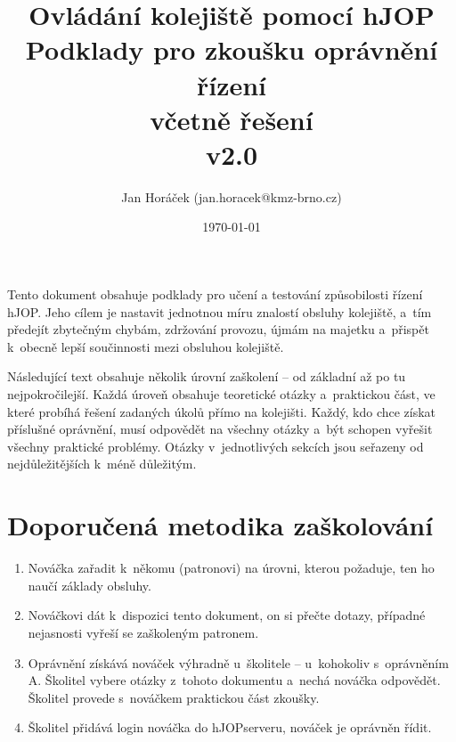 \documentclass[12pt,a4paper]{article}
\begin{document}
\thispagestyle{empty}

\setlength{\parindent}{0cm}
\setlength{\parskip}{.4\baselineskip plus2pt minus1pt}
\setlength{\droptitle}{-5em}

\title{\bfseries
{\Large Ovládání kolejiště pomocí hJOP\\}
{\LARGE Podklady pro zkoušku oprávnění řízení\\}
\ifsolution
{\Large \color{gray}včetně řešení\\}
\fi
{\small v2.0}}
\author{Jan Horáček (jan.horacek@kmz-brno.cz)}
\date{\today}
\maketitle

Tento dokument obsahuje podklady pro učení a testování způsobilosti řízení
hJOP. Jeho cílem je nastavit jednotnou míru znalostí obsluhy kolejiště, a~tím
předejít zbytečným chybám, zdržování provozu, újmám na majetku a~přispět
k~obecně lepší součinnosti mezi obsluhou kolejiště.

Následující text obsahuje několik úrovní zaškolení – od základní až po tu
nejpokročilejší. Každá úroveň obsahuje teoretické otázky a~praktickou část, ve
které probíhá řešení zadaných úkolů přímo na kolejišti. Každý, kdo chce získat
příslušné oprávnění, musí odpovědět na všechny otázky a~být schopen vyřešit
všechny praktické problémy. Otázky v~jednotlivých sekcích jsou seřazeny od
nejdůležitějších k~méně důležitým.

\section{Doporučená metodika zaškolování}

\begin{enumerate}[leftmargin=*]
\item Nováčka zařadit k~někomu (patronovi) na úrovni, kterou požaduje, ten ho
naučí základy obsluhy.
\item Nováčkovi dát k~dispozici tento dokument, on si přečte dotazy, případné
nejasnosti vyřeší se zaškoleným patronem.
\item Oprávnění získává nováček výhradně u~školitele – u~kohokoliv s~oprávněním
A.
Školitel vybere otázky z~tohoto dokumentu a~nechá nováčka odpovědět. Školitel
provede s~no\-váč\-kem praktickou část zkoušky.
\item Školitel přidává login nováčka do hJOPserveru, nováček je oprávněn řídit.
\end{enumerate}
\end{document}
